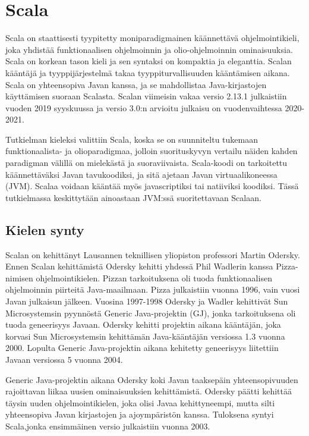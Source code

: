 \chapter{Scala} \label{scala}
Scala on staattisesti tyypitetty moniparadigmainen käännettävä ohjelmointikieli, joka yhdistää funktionaalisen ohjelmoinnin ja olio-ohjelmoinnin ominaisuuksia. Scala on korkean tason kieli ja sen syntaksi on kompaktia ja eleganttia. Scalan kääntäjä ja tyyppijärjestelmä takaa tyyppiturvallisuuden kääntämisen aikana. Scala on yhteensopiva Javan kanssa, ja se mahdollistaa Java-kirjastojen käyttämisen suoraan Scalasta. Scalan viimeisin vakaa versio 2.13.1 julkaistiin vuoden 2019 syyskuussa ja versio 3.0:n arvioitu julkaisu on vuodenvaihtessa 2020-2021.
\cite[Introduction]{tourOfScala}
\cite{roadToScala3}

Tutkielman kieleksi valittiin Scala, koska se on suunniteltu tukemaan funktionaalista- ja olioparadigmaa, jolloin suorituskyvyn vertailu näiden kahden paradigman välillä on mielekästä ja suoraviivaista. Scala-koodi on tarkoitettu käännettäväksi Javan tavukoodiksi, ja sitä ajetaan Javan virtuaalikoneessa (JVM). Scalaa voidaan kääntää myös javascriptiksi tai natiiviksi koodiksi. Tässä tutkielmassa keskittytään ainoastaan JVM:ssä suoritettavaan Scalaan.
\cite[Luku 2]{prorgrammingInScala3rd}
\cite{scalaJs}
\cite{scalaNative}


\section{Kielen synty} \label{Kielen synty}
Scalan on kehittänyt Lausannen teknillisen yliopiston professori Martin Odersky. Ennen Scalan kehittämistä Odersky kehitti yhdessä Phil Wadlerin kanssa Pizza-nimisen ohjelmointikielen. Pizzan tarkoituksena oli tuoda funktionaalisen ohjelmoinnin piirteitä Java-maailmaan. Pizza julkaistiin vuonna 1996, vain vuosi Javan julkaisun jälkeen. Vuosina 1997-1998 Odersky ja Wadler kehittivät Sun Microsystemsin pyynnöstä Generic Java-projektin (GJ), jonka tarkoituksena oli tuoda geneerisyys Javaan. Odersky kehitti projektin aikana kääntäjän, joka korvasi Sun Microsystemsin kehittämän Java-kääntäjän versiossa 1.3 vuonna 2000. Lopulta Generic Java-projektin aikana kehitetty geneerisyys liitettiin Javaan versiossa 5 vuonna 2004.
\cite{originsOfScala}

Generic Java-projektin aikana Odersky koki Javan taaksepäin yhteensopivuuden rajoittavan liikaa uusien ominaisuuksien kehittämistä. Odersky päätti kehittää täysin uuden ohjelmointikielen, joka olisi Javaa kehittyneempi, mutta silti yhteensopiva Javan kirjastojen ja ajoympäristön kanssa. Tuloksena syntyi Scala,jonka ensimmäinen versio julkaistiin vuonna 2003.
\cite{originsOfScala}


